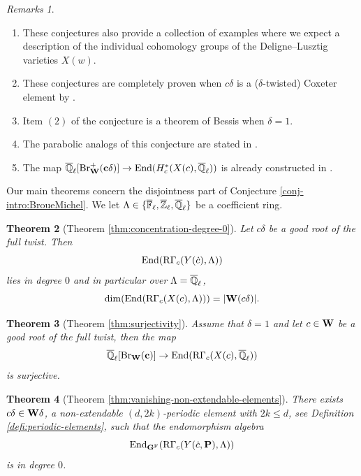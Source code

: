 \documentclass[article, 10pt, oneside, reqno]{amsart}
\theoremstyle{plain}
\newtheorem{thm}{Theorem}[subsection]
\theoremstyle{definition}
\theoremstyle{remark}
\newtheorem{rques}[thm]{Remarks}
\newcommand{\cbf}{\mathbf{c}}
\begin{document}
\begin{rques}
\begin{enumerate}
\item These conjectures also provide a collection of examples where we expect a description of the individual cohomology groups of the Deligne--Lusztig varieties $X(w)$. 
\item These conjectures are completely proven when $c\delta$ is a ($\delta$-twisted) Coxeter element by \cite{LusztigCoxeterOrbits}. 
\item Item $(2)$ of the conjecture is a theorem of Bessis \cite{Bessis} when $\delta = 1$.
\item The parabolic analogs of this conjecture are stated in \cite[Section 9]	{DigneMichelParabolic}. 
\item The map $\Qlb[\Br_{\Wbf}^+(\cbf\delta)] \to \End(H^*_c(X(c), \Qlb))$ is already constructed in \cite{BroueMichelActionRegularElements}.
\end{enumerate}
\end{rques}
 
Our main theorems concern the disjointness part of Conjecture \ref{conj-intro:BroueMichel}. We let $\Lambda \in \{\overline{\mathbb{F}}_{\ell}, \overline{\mathbb{Z}}_{\ell}, \overline{\mathbb{Q}}_{\ell}\}$ be a coefficient ring.

\begin{thm}[Theorem \ref{thm:concentration-degree-0}]\label{thm-intro:concentration-degree-0}
Let $c\delta$ be a good root of the full twist. Then 
$$\mathrm{End}(\mathrm{R\Gamma}_c(Y(\dot{c}), \Lambda))$$
lies in degree $0$ and in particular over $\Lambda = \overline{\mathbb{Q}}_{\ell}$, 
$$\dim(\mathrm{End}(\mathrm{R\Gamma}_c(X(c), \Lambda))) = |\mathbf{W}(c\delta)|.$$
\end{thm}

\begin{thm}[Theorem \ref{thm:surjectivity}]\label{thm-intro:surjectivity}
Assume that $\delta = 1$ and let $c \in \mathbf{W}$ be a good root of the full twist, then the map 
$$\Qlb[\Br_{\Wbf}(\cbf)] \to \End(\RGamma_c(X(c), \Qlb))$$
is surjective. 
\end{thm}

\begin{thm}[Theorem \ref{thm:vanishing-non-extendable-elements}]\label{thm-intro:concentration-degree-0-parabolic}
There exists $c\delta \in \mathbf{W}\delta$, a non-extendable $(d,2k)$-periodic element with $2k \leq d$, see Definition \ref{defi:periodic-elements}, such that the endomorphism algebra 
$$\mathrm{End}_{\mathbf{G}^{\mathrm{F}}}(\mathrm{R\Gamma}_c(Y(\dot{c}, \mathbf{P}), \Lambda))$$ 
is in degree $0$. 
\end{thm}
\end{document}
